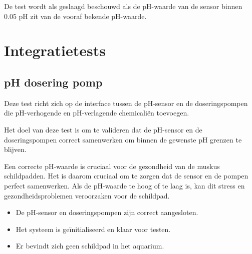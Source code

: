 \documentclass[a4paper]{report}
\begin{document}
\begin{tcolorbox}[colback=white, colframe=black, title=Slagingscriteria]
De test wordt als geslaagd beschouwd als de pH-waarde van de sensor binnen 0.05 pH zit van de vooraf bekende pH-waarde.
\end{tcolorbox}


\section{Integratietests}
\subsection{pH dosering pomp}
\begin{tcolorbox}[colback=white, colframe=black, title=Beschrijving van de interface]
  Deze test richt zich op de interface tussen de pH-sensor en de doseringspompen die pH-verhogende en pH-verlagende chemicaliën toevoegen.
\end{tcolorbox}

\begin{tcolorbox}[colback=white, colframe=black, title=Test Doel]
  Het doel van deze test is om te valideren dat de pH-sensor en de doseringspompen correct samenwerken om binnen de gewenste pH grenzen te blijven.
\end{tcolorbox}

\begin{tcolorbox}[colback=white, colframe=black, title=Test Motivatie]
  Een correcte pH-waarde is cruciaal voor de gezondheid van de muskus schildpadden. Het is daarom cruciaal om te zorgen dat de sensor en de pompen perfect samenwerken.
  Als de pH-waarde te hoog of te laag is, kan dit stress en gezondheidsproblemen veroorzaken voor de schildpad.
\end{tcolorbox}

\begin{tcolorbox}[colback=white, colframe=black, title=Test Criteria]
  \begin{itemize}
    \item De pH-sensor en doseringspompen zijn correct aangesloten.
    \item Het systeem is geïnitialiseerd en klaar voor testen.
    \item Er bevindt zich geen schildpad in het aquarium.
  \end{itemize}
\end{tcolorbox}
\end{document}
